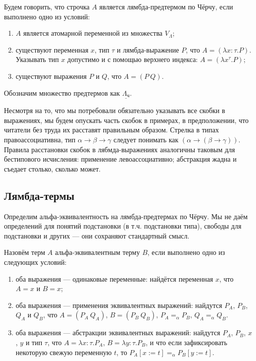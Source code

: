 \documentclass[10pt,a4paper,oneside]{article}
\begin{document}
\begin{definition}
Будем говорить, что строчка $A$ является лямбда-предтермом по Чёрчу, если выполнено одно из условий:

\begin{enumerate}
\item $A$ является атомарной переменной из множества $V_\Lambda$;
\item существуют переменная $x$, тип $\tau$ и лямбда-выражение $P$, что $A = (\lambda x: \tau.P)$.
Указывать тип $x$ допустимо и с помощью верхнего индекса: $A = (\lambda x^\tau.P)$;
\item существуют выражения $P$ и $Q$, что $A = (P\ Q)$.
\end{enumerate}

Обозначим множество предтермов как $\underline{\Lambda_\texttt{ч}}$.
\end{definition}

Несмотря на то, что мы потребовали обязательно указывать все скобки в выражениях, мы будем опускать
часть скобок в примерах, в предположении, что читатели без труда их расставят правильным образом.
Стрелка в типах правоассоциативна, тип $\alpha\rightarrow\beta\rightarrow\gamma$ следует
понимать как $(\alpha\rightarrow(\beta\rightarrow\gamma))$.
Правила расстановки скобок в лябмда-выражениях аналогичны таковым для бестипового исчисления: 
применение левоассоциативно; абстракция жадна и съедает столько, сколько может.

\subsection{Лямбда-термы}

Определим альфа-эквивалентность на лямбда-предтермах по Чёрчу.
Мы не даём определений для понятий подстановки (в т.ч. подстановки типа),
свободы для подстановки и других --- они сохраняют стандартный смысл.

\begin{definition}
Назовём терм $A$ альфа-эквивалентным терму $B$, если выполнено одно из следующих условий:

\begin{enumerate}
\item оба выражения --- одинаковые переменные: найдётся переменная $x$, что $A = x$ и $B = x$;
\item оба выражения --- применения эквивалентных выражений: найдутся $P_A$, $P_B$, $Q_A$ и $Q_B$, что
             $A = (P_A\ Q_A)$, $B = (P_B\ Q_B)$, $P_A =_\alpha P_B$, $Q_A =_\alpha Q_B$.
\item оба выражения --- абстракции эквивалентных выражений:
             найдутся $P_A$, $P_B$, $x$, $y$ и тип $\tau$, что $A = \lambda x: \tau.P_A$,
             $B = \lambda y: \tau.P_B$, и что если зафиксировать некоторую свежую переменную
             $t$, то $P_A[x := t] =_\alpha P_B[y := t]$.
\end{enumerate}
\end{definition}
\end{document}

